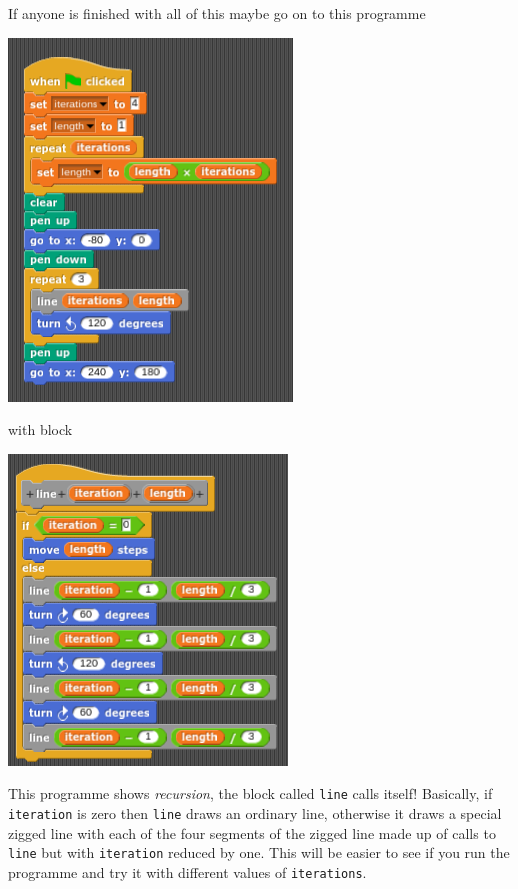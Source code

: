 \documentclass[11pt,a4paper]{scrartcl}
\begin{document}
If anyone is finished with all of this maybe go on to this programme
\begin{center}
\includegraphics{koch.png}
\end{center}
with block
\begin{center}
\includegraphics{koch_block.png}
\end{center}
This programme shows \textsl{recursion}, the block called
\texttt{line} calls itself! Basically, if \texttt{iteration} is zero
then \texttt{line} draws an ordinary line, otherwise it draws a
special zigged line with each of the four segments of the zigged line
made up of calls to \texttt{line} but with \texttt{iteration} reduced
by one. This will be easier to see if you run the programme and try it with different values of \texttt{iterations}.
\end{document}
